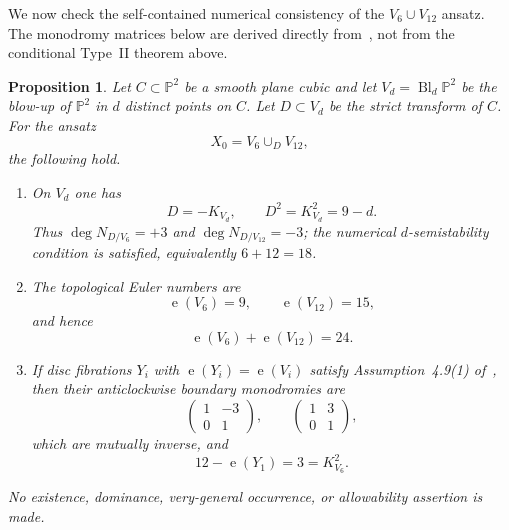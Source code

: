 \documentclass[12pt]{article}
\theoremstyle{plain}
\newtheorem{proposition}[theorem]{Proposition}
\theoremstyle{definition}
\DeclareMathOperator{\Bl}{Bl}
\DeclareMathOperator{\eul}{e}
\newcommand{\bP}{\mathbb{P}}
\begin{document}
We now check the self-contained numerical consistency of the $V_6\cup V_{12}$ ansatz.  The monodromy matrices below are derived directly from~\cite[Assumption~4.9(1) and Remark~4.12]{GT24}, not from the conditional Type~II theorem above.

\begin{proposition}\label{prop:V6V12}
Let $C\subset \bP^2$ be a smooth plane cubic and let $V_d=\Bl_d \bP^2$ be the blow-up of $\bP^2$ in $d$ distinct points on $C$.  Let $D\subset V_d$ be the strict transform of $C$.  For the ansatz
\[
X_0 = V_6\cup_D V_{12},
\]
the following hold.
\begin{enumerate}
\item On $V_d$ one has
\[
D = -K_{V_d},\qquad D^2 = K_{V_d}^2 = 9-d.
\]
Thus $\deg N_{D/V_6}=+3$ and $\deg N_{D/V_{12}}=-3$; the numerical $d$-semistability condition is satisfied, equivalently $6+12=18$.
\item The topological Euler numbers are
\[
\eul(V_6)=9,\qquad \eul(V_{12})=15,
\]
and hence
\[
\eul(V_6)+\eul(V_{12})=24.
\]
\item If disc fibrations $Y_i$ with $\eul(Y_i)=\eul(V_i)$ satisfy Assumption~4.9(1) of~\cite{GT24}, then their anticlockwise boundary monodromies are
\[
\begin{pmatrix}
1 & -3\\
0 & 1
\end{pmatrix},
\qquad
\begin{pmatrix}
1 & 3\\
0 & 1
\end{pmatrix},
\]
which are mutually inverse, and
\[
12-\eul(Y_1)=3=K_{V_6}^2.
\]
\end{enumerate}
No existence, dominance, very-general occurrence, or allowability assertion is made.
\end{proposition}
\end{document}

